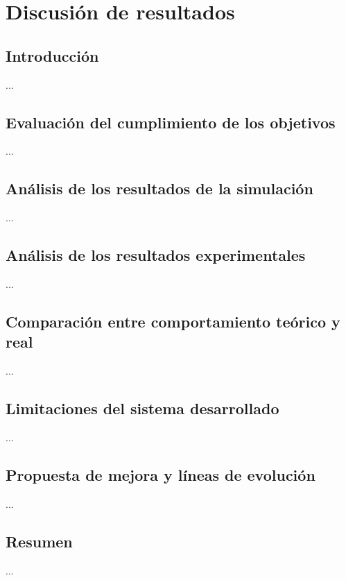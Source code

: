 \chapter{Discusión de resultados}
\label{cap:capitulo9}

\vspace{0.25cm}

\section{Introducción}
\label{sec:segundaseccion}

...

\section{Evaluación del cumplimiento de los objetivos}
\label{sec:segundaseccion}

...

\section{Análisis de los resultados de la simulación}
\label{sec:segundaseccion}

...

\section{Análisis de los resultados experimentales}
\label{sec:segundaseccion}

...

\section{Comparación entre comportamiento teórico y real}
\label{sec:segundaseccion}

...

\section{Limitaciones del sistema desarrollado}
\label{sec:segundaseccion}

...

\section{Propuesta de mejora y líneas de evolución}
\label{sec:segundaseccion}

...

\section{Resumen}
\label{sec:segundaseccion}

...

